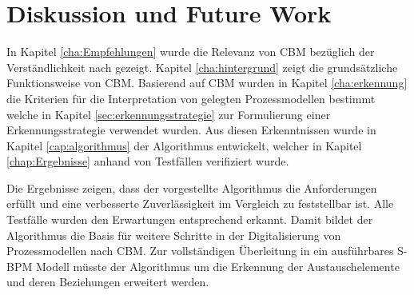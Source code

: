 %
%
% 
% 
% 


\chapter{Diskussion und Future Work}
\label{chap:Diskussion}
In Kapitel \ref{cha:Empfehlungen} wurde die Relevanz von CBM bezüglich der Verständlichkeit nach \citet{MENDLING2010127} gezeigt. Kapitel \ref{cha:hintergrund} zeigt die grundsätzliche Funktionsweise von CBM. Basierend auf CBM wurden in Kapitel \ref{cha:erkennung} die Kriterien für die Interpretation von gelegten Prozessmodellen bestimmt welche in Kapitel \ref{sec:erkennungsstrategie} zur Formulierung einer Erkennungsstrategie verwendet wurden. Aus diesen Erkenntnissen wurde in Kapitel \ref{cap:algorithmus} der Algorithmus entwickelt, welcher in Kapitel \ref{chap:Ergebnisse} anhand von Testfällen verifiziert wurde. 

Die Ergebnisse zeigen, dass der vorgestellte Algorithmus die Anforderungen erfüllt und eine verbesserte Zuverlässigkeit im Vergleich zu \citet{max} feststellbar ist. Alle Testfälle wurden den Erwartungen entsprechend erkannt. Damit bildet der Algorithmus die Basis für weitere Schritte in der Digitalisierung von Prozessmodellen nach CBM. Zur vollständigen Überleitung in ein ausführbares S-BPM Modell müsste der Algorithmus um die Erkennung der Austauschelemente und deren Beziehungen erweitert werden. 